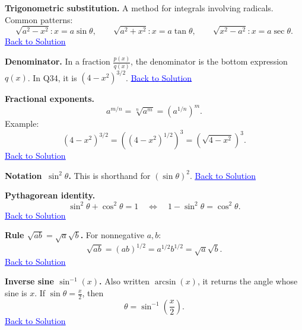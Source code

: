 \documentclass{article}
\newcommand{\defanchor}[1]{\hypertarget{def:#1}{}}
\newcommand{\backtosol}{\hyperlink{back:solution}{\textcolor{blue}{\underline{Back to Solution}}}}
\begin{document}
    \defanchor{trig-sub}\textbf{Trigonometric substitution.}
    A method for integrals involving radicals. Common patterns:
    \[
    \sqrt{a^2-x^2}: x=a\sin\theta,\qquad
    \sqrt{a^2+x^2}: x=a\tan\theta,\qquad
    \sqrt{x^2-a^2}: x=a\sec\theta.
    \]
    \backtosol

    \defanchor{denominator}\textbf{Denominator.}
    In a fraction $\frac{p(x)}{q(x)}$, the denominator is the bottom expression $q(x)$.
    In Q34, it is $(4-x^2)^{3/2}$.
    \backtosol

    \defanchor{frac-exp}\textbf{Fractional exponents.}
    \[
    a^{m/n}=\sqrt[n]{a^m}=\left(a^{1/n}\right)^m.
    \]
    Example:
    \[
    (4-x^2)^{3/2}=\left((4-x^2)^{1/2}\right)^3=\left(\sqrt{4-x^2}\right)^3.
    \]
    \backtosol

    \defanchor{notation}\textbf{Notation $\,\sin^2\theta$.}
    This is shorthand for $(\sin\theta)^2$.
    \backtosol

    \defanchor{pyth-id}\textbf{Pythagorean identity.}
    \[
    \sin^2\theta+\cos^2\theta=1
    \quad\Longleftrightarrow\quad
    1-\sin^2\theta=\cos^2\theta.
    \]
    \backtosol

    \defanchor{sqrt-rule}\textbf{Rule $\sqrt{ab}=\sqrt a\sqrt b$.}
    For nonnegative $a,b$:
    \[
    \sqrt{ab}=(ab)^{1/2}=a^{1/2}b^{1/2}=\sqrt a\sqrt b.
    \]
    \backtosol

    \defanchor{inv-sine}\textbf{Inverse sine $\sin^{-1}(x)$.}
    Also written $\arcsin(x)$, it returns the angle whose sine is $x$.
    If $\sin\theta=\frac{x}{2}$, then
    \[
    \theta=\sin^{-1}\!\left(\frac{x}{2}\right).
    \]
    \backtosol
\end{document}
